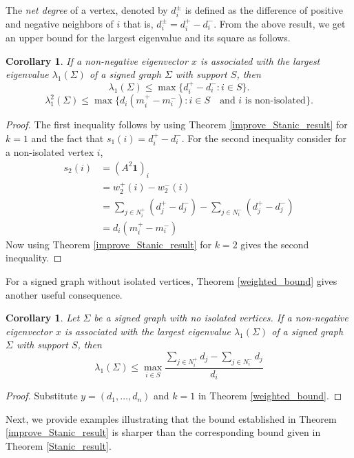 \documentclass[12pt]{article}
\theoremstyle{plain}
\newtheorem{corollary}[theorem]{Corollary}
\numberwithin{equation}{section}
\begin{document}
	The \emph{net degree} of a vertex, denoted by $d_{i}^{\pm}$ is defined as the difference of positive and negative neighbors of $i$ that is, $d_{i}^{\pm}=d_{i}^{+}-d_{i}^{-}$. 
	From the above result, we get an upper bound for the largest eigenvalue and its square as follows.
	\begin{corollary}
		If a non-negative eigenvector $x$ is associated with the largest eigenvalue $\lambda_{1}(\Sigma)$ of a signed graph  $\Sigma$ with support $S$, then 
		\[\lambda_{1}(\Sigma)\leq \max\{d_{i}^{+}-d_{i}^{-} : i \in S\}.\]
		\[\lambda_{1}^2(\Sigma)\leq \max\{d_{i}(m_i^+-m_i^-) : i \in S \quad \text{and } i \text{ is non-isolated}\}.\]
	\end{corollary}
	\begin{proof}
		The first inequality follows by using Theorem \ref{improve_Stanic_result} for $k=1$ and the fact that $s_1(i) = d_i^+-d_i^-$. For the second inequality consider for a non-isolated vertex $i$,
		\begin{align*}
			s_2(i)&=(A^2\mathbf{1})_i\\
			&= w_{2}^{+}(i)-w_{2}^{-}(i)\\
			&=\sum \limits_{j \in N_i^+}(d_j^+-d_j^-) - \sum \limits_{j \in N_i^-}(d_j^+-d_j^-)\\
			&=d_i(m^+_i-m^-_i)
		\end{align*}
		Now using Theorem \ref{improve_Stanic_result} for $k=2$ gives the second inequality.
	\end{proof}
	
	For a signed graph without isolated vertices, Theorem \ref{weighted_bound} gives another useful consequence.
	\begin{corollary}
		Let $\Sigma$ be a signed graph with no isolated vertices. If a non-negative eigenvector $x$ is associated with the largest eigenvalue $\lambda_{1}(\Sigma)$ of a signed graph  $\Sigma$ with support $S$, then 
		\[\lambda_{1}(\Sigma)\leq \max \limits_{i \in S} \dfrac{\sum \limits_{j \in N_i^+}d_j-\sum \limits_{j \in N_i^-}d_j}{d_i}\]
	\end{corollary}
	\begin{proof}
		Substitute $y= (d_1, \dots, d_n)$ and $k=1$ in Theorem \ref{weighted_bound}.
	\end{proof}    
	
	Next, we provide examples illustrating that the bound established in Theorem \ref{improve_Stanic_result} is sharper than the corresponding bound given in Theorem \ref{Stanic_result}.
	
\end{document}
